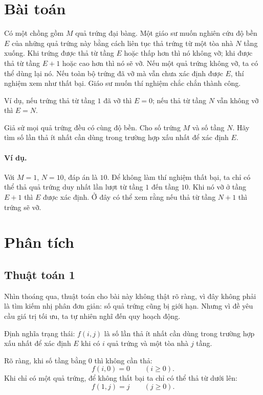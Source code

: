 \documentclass[11pt]{article}
\begin{document}
\section{Bài toán}

Có một chồng gồm $M$ quả trứng đại bàng. Một giáo sư muốn nghiên cứu độ bền
$E$ của những quả trứng này bằng cách liên tục thả trứng từ một tòa nhà
$N$ tầng xuống. Khi trứng được thả từ tầng $E$ hoặc thấp hơn thì nó không vỡ;
khi được thả từ tầng $E+1$ hoặc cao hơn thì nó sẽ vỡ. Nếu một quả trứng không
vỡ, ta có thể dùng lại nó. Nếu toàn bộ trứng đã vỡ mà vẫn chưa xác định được
$E$, thí nghiệm xem như thất bại. Giáo sư muốn thí nghiệm chắc chắn thành
công.

Ví dụ, nếu trứng thả từ tầng $1$ đã vỡ thì $E=0$; nếu thả từ tầng $N$ vẫn
không vỡ thì $E=N$.

Giả sử mọi quả trứng đều có cùng độ bền. Cho số trứng $M$ và số tầng $N$.
Hãy tìm số lần thả ít nhất cần dùng trong trường hợp xấu nhất để xác định
$E$.

\paragraph{Ví dụ.}
Với $M=1$, $N=10$, đáp án là $10$. Để không làm thí nghiệm thất bại, ta chỉ có
thể thả quả trứng duy nhất lần lượt từ tầng $1$ đến tầng $10$. Khi nó vỡ ở
tầng $E+1$ thì $E$ được xác định. Ở đây có thể xem rằng nếu thả từ tầng
$N+1$ thì trứng sẽ vỡ.

\section{Phân tích}

\subsection{Thuật toán 1}

Nhìn thoáng qua, thuật toán cho bài này không thật rõ ràng, vì đây không phải
là tìm kiếm nhị phân đơn giản: số quả trứng cũng bị giới hạn. Nhưng vì đề yêu
cầu giá trị tối ưu, ta tự nhiên nghĩ đến quy hoạch động.

Định nghĩa trạng thái: $f(i,j)$ là số lần thả ít nhất cần dùng trong trường
hợp xấu nhất để xác định $E$ khi có $i$ quả trứng và một tòa nhà $j$ tầng.

Rõ ràng, khi số tầng bằng $0$ thì không cần thả:
\[
  f(i,0)=0 \qquad (i\ge 0).
\]
Khi chỉ có một quả trứng, để không thất bại ta chỉ có thể thả từ dưới lên:
\[
  f(1,j)=j \qquad (j\ge 0).
\]
\end{document}
